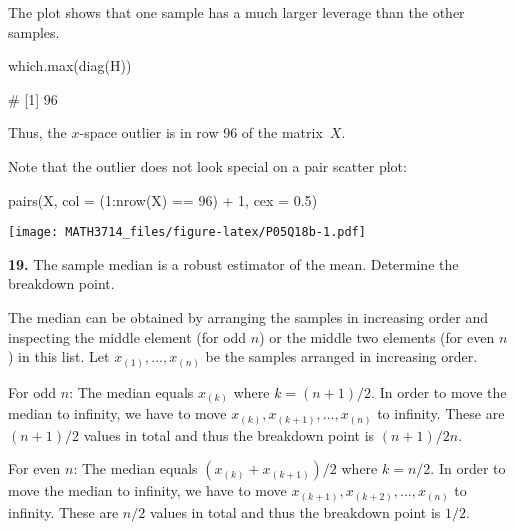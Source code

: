 \documentclass[
  a4paper,
]{article}
\newenvironment{Shaded}{\begin{snugshade}}{\end{snugshade}}
\newcommand{\AttributeTok}[1]{\textcolor[rgb]{0.77,0.63,0.00}{#1}}
\newcommand{\DecValTok}[1]{\textcolor[rgb]{0.00,0.00,0.81}{#1}}
\newcommand{\FloatTok}[1]{\textcolor[rgb]{0.00,0.00,0.81}{#1}}
\newcommand{\FunctionTok}[1]{\textcolor[rgb]{0.00,0.00,0.00}{#1}}
\newcommand{\NormalTok}[1]{#1}
\newcommand{\SpecialCharTok}[1]{\textcolor[rgb]{0.00,0.00,0.00}{#1}}
\theoremstyle{definition}
\theoremstyle{definition}
\theoremstyle{definition}
\theoremstyle{definition}
\theoremstyle{remark}
\begin{document}
\begin{myanswers}
The plot shows that one sample has a much larger leverage than
the other samples.

\begin{Shaded}
\begin{Highlighting}[]
\FunctionTok{which.max}\NormalTok{(}\FunctionTok{diag}\NormalTok{(H))}
\end{Highlighting}
\end{Shaded}

\begin{Shaded}
\begin{Highlighting}[]
\NormalTok{\# [1] 96}
\end{Highlighting}
\end{Shaded}

Thus, the \(x\)-space outlier is in row 96 of the matrix~\(X\).

Note that the outlier does not look special on a pair scatter plot:

\begin{Shaded}
\begin{Highlighting}[]
\FunctionTok{pairs}\NormalTok{(X, }\AttributeTok{col =}\NormalTok{ (}\DecValTok{1}\SpecialCharTok{:}\FunctionTok{nrow}\NormalTok{(X) }\SpecialCharTok{==} \DecValTok{96}\NormalTok{) }\SpecialCharTok{+} \DecValTok{1}\NormalTok{, }\AttributeTok{cex =} \FloatTok{0.5}\NormalTok{)}
\end{Highlighting}
\end{Shaded}

\texttt{[image: MATH3714\_files/figure-latex/P05Q18b-1.pdf]}

\end{myanswers}

\textbf{19.}
The sample median is a robust estimator of the mean.
Determine the breakdown point.

\begin{myanswers}
The median can be obtained by arranging the samples in increasing
order and inspecting the middle element (for odd \(n\)) or
the middle two elements (for even \(n\)) in this list.
Let \(x_{(1)}, \ldots, x_{(n)}\) be the samples arranged in increasing order.

For odd \(n\): The median equals \(x_{(k)}\) where \(k = (n+1) / 2\).
In order to move the median to infinity, we have
to move \(x_{(k)}, x_{(k+1)}, \ldots, x_{(n)}\) to infinity.
These are \((n+1) / 2\) values in total and thus the breakdown point
is \((n+1) / 2n\).

For even \(n\): The median equals \((x_{(k)} + x_{(k+1)})/2\) where \(k = n / 2\).
In order to move the median to infinity, we have
to move \(x_{(k+1)}, x_{(k+2)}, \ldots, x_{(n)}\) to infinity.
These are \(n / 2\) values in total and thus the breakdown point
is \(1/2\).

\end{myanswers}
\end{document}
